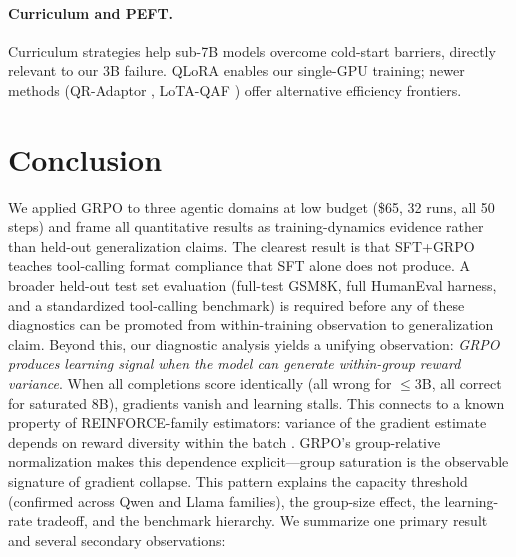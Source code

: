 \documentclass{article}
\begin{document}
\paragraph{Curriculum and PEFT.}
Curriculum strategies \citep{parashar2025curriculum, chen2025selfevolving} help sub-7B models overcome cold-start barriers, directly relevant to our 3B failure. QLoRA \citep{dettmers2023qlora} enables our single-GPU training; newer methods (QR-Adaptor \citep{zhou2025qradaptor}, LoTA-QAF \citep{chen2025lotaqaf}) offer alternative efficiency frontiers.

\section{Conclusion}

We applied GRPO to three agentic domains at low budget (\$65, 32 runs, all 50 steps) and frame all quantitative results as training-dynamics evidence rather than held-out generalization claims. The clearest result is that SFT+GRPO teaches tool-calling format compliance that SFT alone does not produce. A broader held-out test set evaluation (full-test GSM8K, full HumanEval harness, and a standardized tool-calling benchmark) is required before any of these diagnostics can be promoted from within-training observation to generalization claim. Beyond this, our diagnostic analysis yields a unifying observation: \emph{GRPO produces learning signal when the model can generate within-group reward variance}. When all completions score identically (all wrong for $\leq$3B, all correct for saturated 8B), gradients vanish and learning stalls. This connects to a known property of REINFORCE-family estimators: variance of the gradient estimate depends on reward diversity within the batch \citep{williams1992simple}. GRPO's group-relative normalization makes this dependence explicit---group saturation is the observable signature of gradient collapse. This pattern explains the capacity threshold (confirmed across Qwen and Llama families), the group-size effect, the learning-rate tradeoff, and the benchmark hierarchy. We summarize one primary result and several secondary observations:
\end{document}
